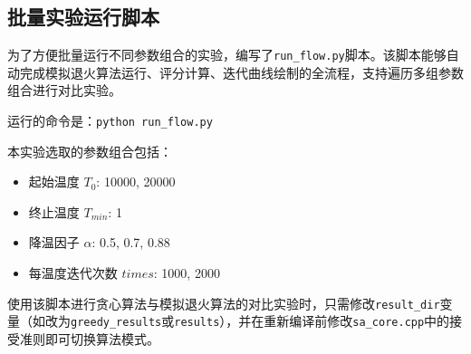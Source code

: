 \documentclass[UTF8,12pt,a4paper]{ctexart}
\begin{document}
\subsection{批量实验运行脚本}

为了方便批量运行不同参数组合的实验，编写了\texttt{run\_flow.py}脚本。该脚本能够自动完成模拟退火算法运行、评分计算、迭代曲线绘制的全流程，支持遍历多组参数组合进行对比实验。

运行的命令是：\texttt{python run\_flow.py}

本实验选取的参数组合包括：
\begin{itemize}
	\item 起始温度 $T_0$: 10000, 20000
	\item 终止温度 $T_{min}$: 1
	\item 降温因子 $\alpha$: 0.5, 0.7, 0.88
	\item 每温度迭代次数 $times$: 1000, 2000
\end{itemize}

使用该脚本进行贪心算法与模拟退火算法的对比实验时，只需修改\texttt{result\_dir}变量（如改为\texttt{greedy\_results}或\texttt{results}），并在重新编译前修改\texttt{sa\_core.cpp}中的接受准则即可切换算法模式。
\end{document}
